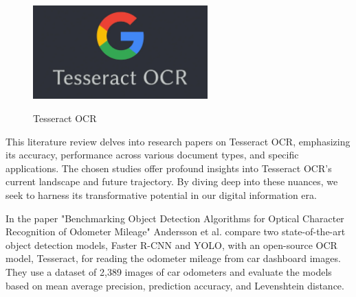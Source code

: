 \vspace{1cm}

\begin{figure}[ht]
    \centering
    \includegraphics[width=0.6\textwidth]{Figures/tesseract_ocr.jpg}
    \caption[Tesseract OCR]{Tesseract OCR}\cite{liTrOCRTransformerBasedOptical2023}
    \label{fig:Tesseract OCR}
\end{figure}



This literature review delves into research papers on Tesseract OCR, emphasizing its accuracy, performance across various document types, and specific applications. The chosen studies offer profound insights into Tesseract OCR's current landscape and future trajectory. By diving deep into these nuances, we seek to harness its transformative potential in our digital information era.

In the paper "Benchmarking Object Detection Algorithms for Optical Character Recognition of Odometer Mileage" Andersson et al. compare two state-of-the-art object detection models, Faster R-CNN and YOLO, with an open-source OCR model, Tesseract, for reading the odometer mileage from car dashboard images. They use a dataset of 2,389 images of car odometers and evaluate the models based on mean average precision, prediction accuracy, and Levenshtein distance.

